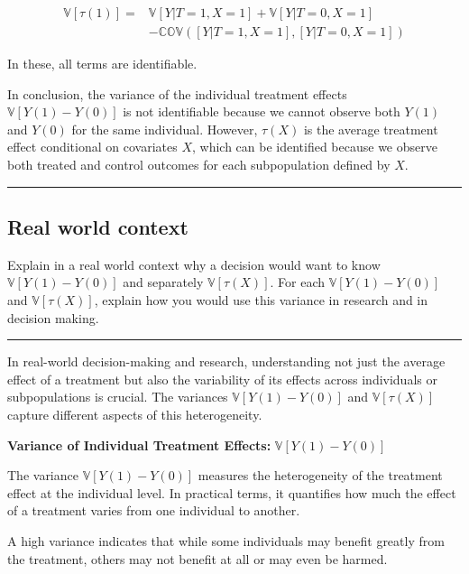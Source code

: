 \documentclass{article}
\newenvironment{colorparagraph}[1]{\par\color{#1}}{\par}
\begin{document}
\begin{align*}
  \mathbb{V}[\tau(1)] =& \mathbb{V}[Y | T = 1, X = 1] + \mathbb{V}[Y | T = 0, X = 1] \\
  &- \mathbb{COV}([Y | T = 1, X = 1], [Y | T = 0, X = 1])
\end{align*}

In these, all terms are identifiable.

In conclusion, the variance of the individual treatment effects \(\mathbb{V}[Y(1) - Y(0)]\) is not identifiable because we cannot observe both \(Y(1)\) and \(Y(0)\) for the same individual. However, \(\tau(X)\) is the average treatment effect conditional on covariates \(X\), which can be identified because we observe both treated and control outcomes for each subpopulation defined by \(X\).
    
\newpage

\begin{colorparagraph}{questioncolor}
\rule{\textwidth}{0.5pt}

\label{q1c}\subsection{Real world context}
Explain in a real world context why a decision would want to know \(\mathbb{V}[Y(1) - Y(0)]\) and separately \(\mathbb{V}[\tau(X)]\). For each \(\mathbb{V}[Y(1) - Y(0)]\) and \(\mathbb{V}[\tau(X)]\), explain how you would use this variance in research and in decision making.

\rule{\textwidth}{0.5pt}
\end{colorparagraph}

In real-world decision-making and research, understanding not just the average effect of a treatment but also the variability of its effects across individuals or subpopulations is crucial. The variances \(\mathbb{V}[Y(1) - Y(0)]\) and \(\mathbb{V}[\tau(X)]\) capture different aspects of this heterogeneity.

\textbf{Variance of Individual Treatment Effects:} \(\mathbb{V}[Y(1) - Y(0)]\)

The variance \(\mathbb{V}[Y(1) - Y(0)]\) measures the heterogeneity of the treatment effect at the individual level. In practical terms, it quantifies how much the effect of a treatment varies from one individual to another.

A high variance indicates that while some individuals may benefit greatly from the treatment, others may not benefit at all or may even be harmed.
\end{document}
